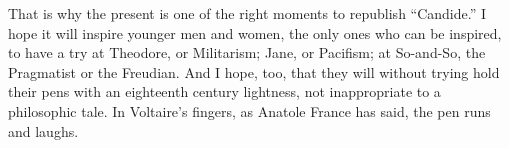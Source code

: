 That is why the present is one of the right moments to republish
``Candide.'' I hope it will inspire younger men and women, the only ones
who can be inspired, to have a try at Theodore, or Militarism; Jane, or
Pacifism; at So-and-So, the Pragmatist or the Freudian. And I hope, too,
that they will without trying hold their pens with an eighteenth century
lightness, not inappropriate to a philosophic tale. In Voltaire's
fingers, as Anatole France has said, the pen runs and laughs. \\
